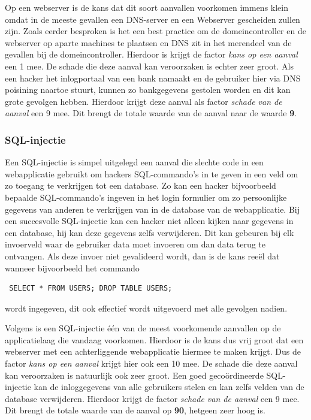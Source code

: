 \documentclass[pdftex,a4paper,12pt]{report}
\begin{document}
Op een webserver is de kans dat dit soort aanvallen voorkomen immens klein omdat in de meeste gevallen een DNS-server en een Webserver gescheiden zullen zijn. Zoals eerder besproken is het een best practice om de domeincontroller en de webserver op aparte machines te plaatsen en DNS zit in het merendeel van de gevallen bij de domeincontroller. Hierdoor is krijgt de factor \textit{kans op een aanval} een 1 mee. De schade die deze aanval kan veroorzaken is echter zeer groot. Als een hacker het inlogportaal van een bank namaakt en de gebruiker hier via DNS poisining naartoe stuurt, kunnen zo bankgegevens gestolen worden en dit kan grote gevolgen hebben. Hierdoor krijgt deze aanval als factor \textit{schade van de aanval} een 9 mee. Dit brengt de totale waarde van de aanval naar de waarde \textbf{9}.

\subsubsection{SQL-injectie}
Een SQL-injectie is simpel uitgelegd een aanval die slechte code in een webapplicatie gebruikt om hackers SQL-commando's in te geven in een veld om zo toegang te verkrijgen tot een database. Zo kan een hacker bijvoorbeeld bepaalde SQL-commando's ingeven in het login formulier om zo persoonlijke gegevens van anderen te verkrijgen van in de database van de webapplicatie. Bij een succesvolle SQL-injectie kan een hacker niet alleen kijken naar gegevens in een database, hij kan deze gegevens zelfs verwijderen. Dit kan gebeuren bij elk invoerveld waar de gebruiker data moet invoeren om dan data terug te ontvangen. Als deze invoer niet gevalideerd wordt, dan is de kans reeël dat wanneer bijvoorbeeld het commando \begin{verbatim} SELECT * FROM USERS; DROP TABLE USERS;\end{verbatim} wordt ingegeven, dit ook effectief wordt uitgevoerd met alle gevolgen nadien. \citep{Acunetix2014} \newline

Volgens \cite{Acunetix2014} is een SQL-injectie één van de meest voorkomende aanvallen op de applicatielaag die vandaag voorkomen. Hierdoor is de kans dus vrij groot dat een webserver met een achterliggende webapplicatie hiermee te maken krijgt. Dus de factor \textit{kans op een aanval} krijgt hier ook een 10 mee. De schade die deze aanval kan veroorzaken is natuurlijk ook zeer groot. Een goed gecoördineerde SQL-injectie kan de inloggegevens van alle gebruikers stelen en kan zelfs velden van de database verwijderen. Hierdoor krijgt de factor \textit{schade van de aanval} een 9 mee. Dit brengt de totale waarde van de aanval op \textbf{90}, hetgeen zeer hoog is.
\end{document}
